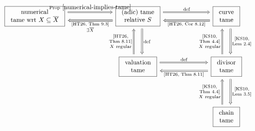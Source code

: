 \documentclass[a4paper,twoside,11pt,reqno]{amsart}
\newcommand{\ov}[1]{\overline{#1}}
\theoremstyle{definition}
\numberwithin{equation}{subsection}
\begin{document}
\[
\begin{tikzcd}[column sep=7em, row sep=4em]
\fbox{\begin{tabular}{c}
numerical \\
tame wrt $X \subseteq \ov{X}$
\end{tabular}} 
\ar[r, Rightarrow, shift left=1.5ex, "\text{Prop}~\ref{numerical-implies-tame}"] 
& 
\fbox{\begin{tabular}{c}
(adic) tame \\
relative $S$
\end{tabular}}
\ar[l, Rightarrow, shift left=1.5ex, "\substack{\text{[HT26, Thm~9.3]} \\ \exists \ov X}"]
\ar[d, Rightarrow, shift left=1.5ex, "\text{def}"] 
\ar[r, Rightarrow, shift left=1.5ex, "\text{def}"] 
& 
\fbox{\begin{tabular}{c}
curve \\
tame
\end{tabular}}
\ar[l, Rightarrow, shift left=1.5ex, "\text{[HT26, Cor~8.12]}"]
\ar[d, Rightarrow, shift left=1.5ex, "\substack{\text{[KS10,} \\ \text{Lem~2.4]}}"]
\\
& 
\fbox{\begin{tabular}{c}
valuation \\
tame
\end{tabular}}
\ar[u, Rightarrow, shift left=1.5ex, "\substack{\text{[HT26,} \\ \text{Thm~8.11]} \\ \text{$X$ regular}}"]
\ar[r, Rightarrow, shift left=1.5ex, "\text{def}"]
&
\fbox{\begin{tabular}{c}
divisor \\
tame
\end{tabular}}
\ar[l, Rightarrow, shift left=1.5ex, "\text{[HT26, Thm~8.11]}"]
\ar[u, Rightarrow, shift left=1.5ex, "\substack{\text{[KS10,} \\ \text{Thm~4.4]} \\ \text{$X$ regular}}"] 
\ar[d, Rightarrow, shift left=1.5ex, "\substack{\text{[KS10,} \\ \text{Lem~3.5]}}"]
\\
&
&
\fbox{\begin{tabular}{c}
chain \\
tame
\end{tabular}}
\ar[u, Rightarrow, shift left=1.5ex, "\substack{\text{[KS10,} \\ \text{Thm~4.4]} \\ \text{$X$ regular}}"]
\end{tikzcd}
\]
\end{document}

